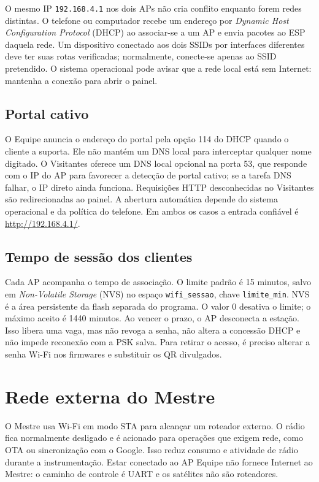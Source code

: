 O mesmo IP \texttt{192.168.4.1} nos dois APs não cria conflito enquanto forem redes distintas. O telefone ou computador recebe um endereço por \emph{Dynamic Host Configuration Protocol} (DHCP) ao associar-se a um AP e envia pacotes ao ESP daquela rede. Um dispositivo conectado aos dois SSIDs por interfaces diferentes deve ter suas rotas verificadas; normalmente, conecte-se apenas ao SSID pretendido. O sistema operacional pode avisar que a rede local está sem Internet: mantenha a conexão para abrir o painel.

\subsection{Portal cativo}
O Equipe anuncia o endereço do portal pela opção 114 do DHCP quando o cliente a suporta. Ele não mantém um DNS local para interceptar qualquer nome digitado. O Visitantes oferece um DNS local opcional na porta 53, que responde com o IP do AP para favorecer a detecção de portal cativo; se a tarefa DNS falhar, o IP direto ainda funciona. Requisições HTTP desconhecidas no Visitantes são redirecionadas ao painel. A abertura automática depende do sistema operacional e da política do telefone. Em ambos os casos a entrada confiável é \url{http://192.168.4.1/}.

\subsection{Tempo de sessão dos clientes}
Cada AP acompanha o tempo de associação. O limite padrão é 15 minutos, salvo em \emph{Non-Volatile Storage} (NVS) no espaço \texttt{wifi\_sessao}, chave \texttt{limite\_min}. NVS é a área persistente da flash separada do programa. O valor 0 desativa o limite; o máximo aceito é 1440 minutos. Ao vencer o prazo, o AP desconecta a estação. Isso libera uma vaga, mas não revoga a senha, não altera a concessão DHCP e não impede reconexão com a PSK salva. Para retirar o acesso, é preciso alterar a senha Wi-Fi nos firmwares e substituir os QR divulgados.

\section{Rede externa do Mestre}\label{sec:wifi-mestre}
O Mestre usa Wi-Fi em modo STA para alcançar um roteador externo. O rádio fica normalmente desligado e é acionado para operações que exigem rede, como OTA ou sincronização com o Google. Isso reduz consumo e atividade de rádio durante a instrumentação. Estar conectado ao AP Equipe não fornece Internet ao Mestre: o caminho de controle é UART e os satélites não são roteadores.

